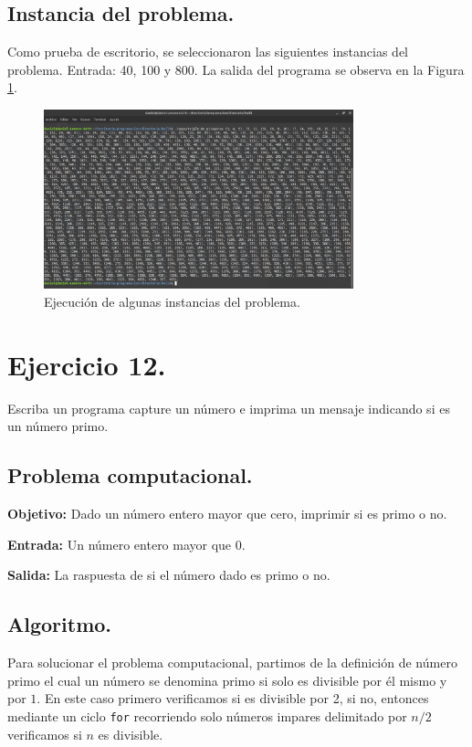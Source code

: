 \documentclass[12pt,letterpaper]{article}
\begin{document}
\subsection{Instancia del problema.}
Como prueba de escritorio, se seleccionaron las siguientes instancias del problema. Entrada: 40, 100 y 800. La salida del programa se observa en la Figura \ref{fig:triple_de_pitagoras}.
\begin{figure}[ht!]
  \centering
  \includegraphics[width=0.8\textwidth]{figures/triple_de_pitagoras}
  \caption{Ejecución de algunas instancias del problema.}
  \label{fig:triple_de_pitagoras}
\end{figure}


\section{Ejercicio 12.}

Escriba un programa capture un n\'umero e imprima un mensaje indicando si es un n\'umero primo.

\subsection{Problema computacional.}
\textbf{Objetivo:} Dado un n\'umero entero mayor que cero, imprimir si es primo o no.

\textbf{Entrada:} Un n\'umero entero mayor que 0.

\textbf{Salida:} La raspuesta de si el n\'umero dado es primo o no.

\subsection{Algoritmo.}
Para solucionar el problema computacional, partimos de la definici\'on de n\'umero primo el cual un n\'umero se denomina primo si solo es divisible por \'el mismo y por $1$. En este caso primero verificamos si es divisible por 2, si no, entonces mediante un ciclo \texttt{for} recorriendo solo n\'umeros impares delimitado por $n/2$ verificamos si $n$ es divisible.
\end{document}
